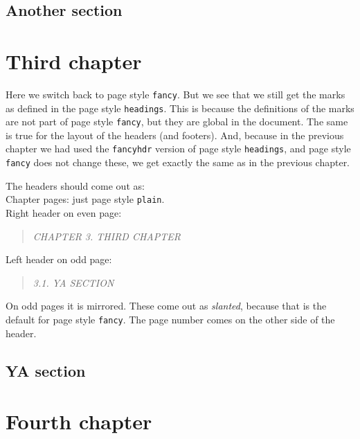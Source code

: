 \documentclass[openany]{book}
\begin{document}
\lipsum[1]

\section{Another section}

\lipsum

\newpage
\pagestyle{fancy}
\chapter{Third chapter}

\noindent
\begin{boxedminipage}{\textwidth}
Here we switch back to page style \texttt{fancy}. 
But we see that we still get the marks as defined in the page style \texttt{headings}.
This is because the definitions of the marks are not part of page style \texttt{fancy}, but they are global in the document. The same is true for the layout of the headers (and footers).
And, because in the previous chapter we had used the \texttt{fancyhdr} version of page style \texttt{headings}, and page style \texttt{fancy} does not change these, we get exactly the same as in the previous chapter.

The headers should come out as:
\\
Chapter pages: just page style \texttt{plain}.
\\
Right header on even page:
\begin{quote}
  \textsl{CHAPTER 3. THIRD CHAPTER}
\end{quote}
Left header on odd page:
\begin{quote}
  \textsl{3.1. YA SECTION}
\end{quote}
On odd pages it is mirrored.
These come out as \textsl{slanted}, because that is the default for page style \texttt{fancy}.
The page number comes on the other side of the header.
\end{boxedminipage}
\bigskip

\lipsum[1]

\section{YA section}

\lipsum

\newpage
\pagestyle{myfancy}
\chapter{Fourth chapter}
\end{document}
